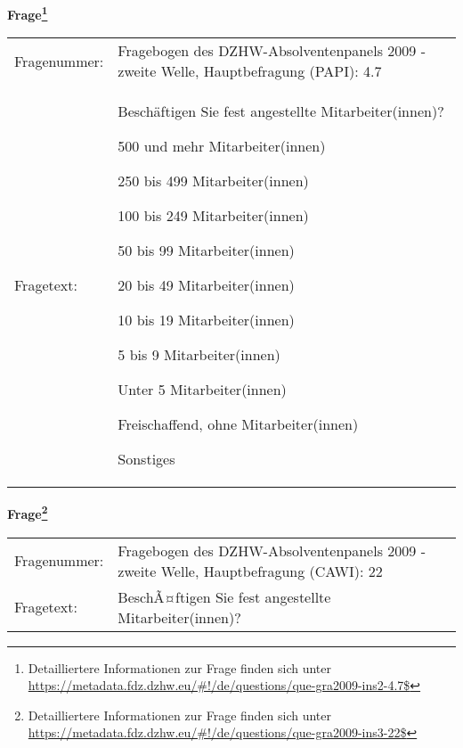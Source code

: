 				\vspace*{0.5cm}
                \noindent\textbf{Frage\footnote{Detailliertere Informationen zur Frage finden sich unter
		              \url{https://metadata.fdz.dzhw.eu/\#!/de/questions/que-gra2009-ins2-4.7$}}}\\
				\begin{tabularx}{\hsize}{@{}lX}
					Fragenummer: &
					  Fragebogen des DZHW-Absolventenpanels 2009 - zweite Welle, Hauptbefragung (PAPI):
					  4.7
 \\
					Fragetext: & Beschäftigen Sie fest angestellte Mitarbeiter(innen)?\par  500 und mehr Mitarbeiter(innen)\par  250 bis 499 Mitarbeiter(innen)\par  100 bis 249 Mitarbeiter(innen)\par  50 bis 99 Mitarbeiter(innen)\par  20 bis 49 Mitarbeiter(innen)\par  10 bis 19 Mitarbeiter(innen)\par  5 bis 9 Mitarbeiter(innen)\par  Unter 5 Mitarbeiter(innen)\par  Freischaffend, ohne Mitarbeiter(innen)\par  Sonstiges \\
				\end{tabularx}
				\vspace*{0.5cm}
                \noindent\textbf{Frage\footnote{Detailliertere Informationen zur Frage finden sich unter
		              \url{https://metadata.fdz.dzhw.eu/\#!/de/questions/que-gra2009-ins3-22$}}}\\
				\begin{tabularx}{\hsize}{@{}lX}
					Fragenummer: &
					  Fragebogen des DZHW-Absolventenpanels 2009 - zweite Welle, Hauptbefragung (CAWI):
					  22
 \\
					Fragetext: & BeschÃ¤ftigen Sie fest angestellte Mitarbeiter(innen)? \\
				\end{tabularx}





